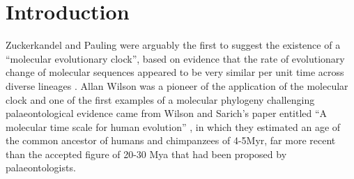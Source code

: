 \section{Introduction} 
Zuckerkandel and Pauling were arguably the first to suggest the existence of a ``molecular evolutionary clock'', based on evidence that the rate of evolutionary change of molecular sequences appeared to be very similar per unit time across diverse lineages \cite{zuckerkandl1965}. Allan Wilson was a pioneer of the application of the molecular clock and one of the first examples of a molecular phylogeny challenging palaeontological evidence came from Wilson and Sarich's paper entitled ``A molecular time scale for human evolution'' \cite{WilsonSarich1969}, in which they estimated an age of the common ancestor of humans and chimpanzees of 4-5Myr, far more recent than the accepted figure of 20-30 Mya that had been proposed by palaeontologists.
  
  
  
  
  
  
  
  
  